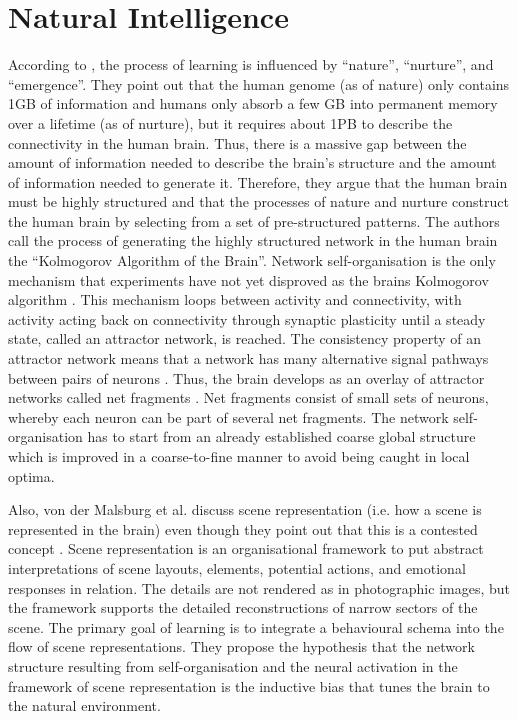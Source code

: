 \section{Natural Intelligence}
According to , the process of learning is influenced by ``nature'', ``nurture'', and ``emergence''.
They point out that the human genome (as of nature) only contains 1GB of information  and humans only absorb a few GB into permanent memory over a lifetime (as of nurture), but it requires about 1PB to describe the connectivity in the human brain.
Thus, there is a massive gap between the amount of information needed to describe the brain's structure and the amount of information needed to generate it.
Therefore, they argue that the human brain must be highly structured and that the processes of nature and nurture construct the human brain by selecting from a set of pre-structured patterns.
The authors call the process of generating the highly structured network in the human brain the ``Kolmogorov  Algorithm of the Brain''.
Network self-organisation is the only mechanism that experiments have not yet disproved as the brains Kolmogorov algorithm .
This mechanism loops between activity and connectivity, with activity acting back on connectivity through synaptic plasticity until a steady state, called an attractor network, is reached.
The consistency property of an attractor network means that a network has many alternative signal pathways between pairs of neurons .
Thus, the brain develops as an overlay of attractor networks called net fragments .
Net fragments consist of small sets of neurons, whereby each neuron can be part of several net fragments.
The network self-organisation has to start from an already established coarse global structure which is improved in a coarse-to-fine manner to avoid being caught in local optima.

Also, von der Malsburg et al. \cite{von_der_Malsburg_Stadelmann_Grewe_2022} discuss scene representation (i.e. how a scene is represented in the brain) even though they point out that this is a contested concept .
Scene representation is an organisational framework to put abstract interpretations of scene layouts, elements, potential actions, and emotional responses in relation.
The details are not rendered as in photographic images, but the framework supports the detailed reconstructions of narrow sectors of the scene.
The primary goal of learning is to integrate a behavioural schema into the flow of scene representations.
They propose the hypothesis that the network structure resulting from self-organisation and the neural activation in the framework of scene representation is the inductive bias that tunes the brain to the natural environment.

